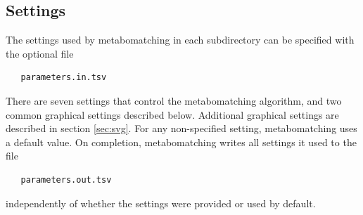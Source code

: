 \documentclass[a4paper,11pt]{article}
\begin{document}
\subsection{Settings\label{sec:settings}}
The settings used by metabomatching in each subdirectory can be specified with the optional file
\begin{verbatim}
   parameters.in.tsv
\end{verbatim}
There are seven settings that control the metabomatching algorithm, and two common graphical settings described below. Additional graphical settings are described in section \ref{sec:svg}. For any non-specified setting, metabomatching uses a default value. On completion, metabomatching writes all settings it used to the file
\begin{verbatim}
   parameters.out.tsv
\end{verbatim}
independently of whether the settings were provided or used by default.
\end{document}
